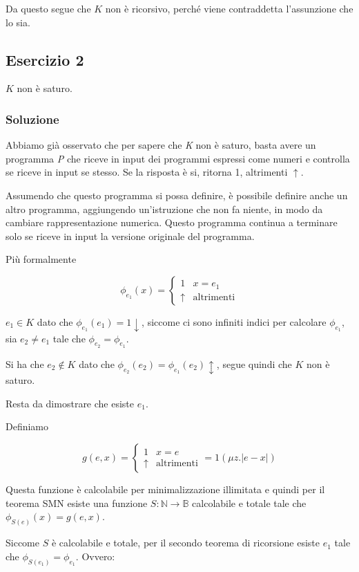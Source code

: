 Da questo segue che $K$ non è ricorsivo, perché viene contraddetta l'assunzione che lo sia.

\subsection{Esercizio 2}

$K$ non è saturo.

\subsubsection{Soluzione}

Abbiamo già osservato che per sapere che \textit{K} non è saturo, basta avere un programma \textit{P} che riceve in input dei programmi espressi come numeri e controlla se riceve in input se stesso. Se la risposta è si, ritorna 1, altrimenti $\uparrow$.

Assumendo che questo programma si possa definire, è possibile definire anche un altro programma, aggiungendo un'istruzione che non fa niente, in modo da cambiare rappresentazione numerica. Questo programma continua a terminare solo se riceve in input la versione originale del programma.

Più formalmente

$$
\phi_{e_1}(x) = \begin{cases}
1 &x = e_1 \\
\uparrow &\text{altrimenti} 
\end{cases}
$$

$e_1 \in K$ dato che $\phi_{e_1}(e_1) = 1 \downarrow$, siccome ci sono infiniti indici per calcolare $\phi_{e_1}$, sia $e_2 \neq e_1$ tale che $\phi_{e_2} = \phi_{e_1}$.

Si ha che $e_2 \notin K$ dato che $\phi_{e_2}(e_2) = \phi_{e_1}(e_2) \updownarrow$, segue quindi che $K$ non è saturo.

Resta da dimostrare che esiste $e_1$.

Definiamo

$$
g(e,x) = \begin{cases}
1 &x = e \\
\uparrow &\text{altrimenti}
\end{cases} = 1(\mu z. |e-x|)
$$

Questa funzione è calcolabile per minimalizzazione illimitata e quindi per il teorema SMN  esiste una funzione $S : \mathbb{N} \rightarrow \mathbb{B}$ calcolabile e totale tale che $\phi_{S(e)}(x) = g(e,x)$.

Siccome $S$ è calcolabile e totale, per il secondo teorema di ricorsione esiste $e_1$ tale che $\phi_{S(e_1)} = \phi_{e_1}$.
Ovvero:

